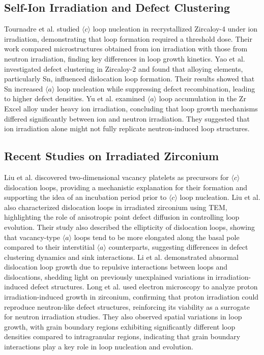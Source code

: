 \documentclass[12pt]{article}
\begin{document}
\subsection*{Self-Ion Irradiation and Defect Clustering}
Tournadre et al. \cite{tournadre2012experimental} studied $\langle c \rangle$ loop nucleation in recrystallized Zircaloy-4 under ion irradiation, demonstrating that loop formation required a threshold dose. Their work compared microstructures obtained from ion irradiation with those from neutron irradiation, finding key differences in loop growth kinetics. Yao et al. \cite{yao2017irradiation} investigated defect clustering in Zircaloy-2 and found that alloying elements, particularly Sn, influenced dislocation loop formation. Their results showed that Sn increased $\langle a \rangle$ loop nucleation while suppressing defect recombination, leading to higher defect densities. Yu et al. \cite{yu2017accumulation} examined $\langle a \rangle$ loop accumulation in the Zr Excel alloy under heavy ion irradiation, concluding that loop growth mechanisms differed significantly between ion and neutron irradiation. They suggested that ion irradiation alone might not fully replicate neutron-induced loop structures.

\subsection*{Recent Studies on Irradiated Zirconium}
Liu et al. \cite{liu2020two} discovered two-dimensional vacancy platelets as precursors for $\langle c \rangle$ dislocation loops, providing a mechanistic explanation for their formation and supporting the idea of an incubation period prior to $\langle c \rangle$ loop nucleation. Liu et al. \cite{liu2021transmission} also characterized dislocation loops in irradiated zirconium using TEM, highlighting the role of anisotropic point defect diffusion in controlling loop evolution. Their study also described the ellipticity of dislocation loops, showing that vacancy-type $\langle a \rangle$ loops tend to be more elongated along the basal pole compared to their interstitial $\langle a \rangle$ counterparts, suggesting differences in defect clustering dynamics and sink interactions. Li et al. \cite{li2024abnormal} demonstrated abnormal dislocation loop growth due to repulsive interactions between loops and dislocations, shedding light on previously unexplained variations in irradiation-induced defect structures. Long et al. \cite{long2024electron} used electron microscopy to analyze proton irradiation-induced growth in zirconium, confirming that proton irradiation could reproduce neutron-like defect structures, reinforcing its viability as a surrogate for neutron irradiation studies. They also observed spatial variations in loop growth, with grain boundary regions exhibiting significantly different loop densities compared to intragranular regions, indicating that grain boundary interactions play a key role in loop nucleation and evolution.
\end{document}

